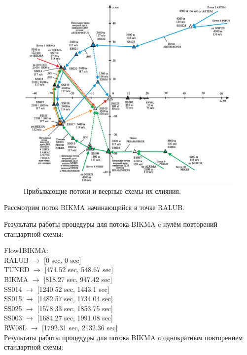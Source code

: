 \documentclass[12pt, a4 paper]{article}
\begin{document}
\begin{figure}[h]
  \begin{center}
      \includegraphics[scale=0.25]{Koltsovo02.png}
        \caption{Прибывающие потоки и веерные схемы их слияния.}                                                                             
    \label{KoltsLand} 
  \end{center}
\end{figure}

Рассмотрим поток BIKMA начинающийся в точке RALUB.

Результаты работы процедуры для потока BIKMA c нулём повторений стандартной схемы:

\noindent Flow1BIKMA:\\
RALUB $\rightarrow$ [0 sec, 0 sec]\\
TUNED $\rightarrow$ [474.52 sec, 548.67 sec]\\
BIKMA $\rightarrow$ [818.27 sec, 947.42 sec]\\
SS014 $\rightarrow$ [1240.52 sec, 1443.1 sec]\\
SS015 $\rightarrow$ [1482.57 sec, 1734.04 sec]\\
SS025 $\rightarrow$ [1578.33 sec, 1853.75 sec]\\
SS003 $\rightarrow$ [1684.27 sec, 1991.08 sec]\\
RW08L $\rightarrow$ [1792.31 sec, 2132.36 sec]\\


Результаты работы процедуры для потока BIKMA c однократным повторением стандартной схемы:
\end{document}
